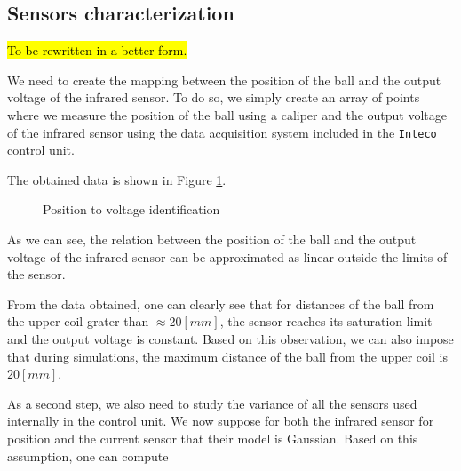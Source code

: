 \subsection{Sensors characterization}
\label{subsec:sensors_characterization}

\hl{To be rewritten in a better form.}

We need to create the mapping between the position of the ball and the output voltage of the infrared sensor.
To do so, we simply create an array of points where we measure the position of the ball using a caliper and the output voltage of the infrared sensor using the data acquisition system included in the \texttt{Inteco} control unit.

The obtained data is shown in Figure \ref{fig:position_to_voltage}.

\begin{figure}[H]
    \centering
    \caption{Position to voltage identification}
    \label{fig:position_to_voltage}
\end{figure}

As we can see, the relation between the position of the ball and the output voltage of the infrared sensor can be approximated as linear outside the limits of the sensor.

From the data obtained, one can clearly see that for distances of the ball from the upper coil grater than $\approx 20 [mm]$, the sensor reaches its saturation limit and the output voltage is constant.
Based on this observation, we can also impose that during simulations, the maximum distance of the ball from the upper coil is $20 [mm]$.

As a second step, we also need to study the variance of all the sensors used internally in the control unit.
We now suppose for both the infrared sensor for position and the current sensor that their model is Gaussian.
Based on this assumption, one can compute